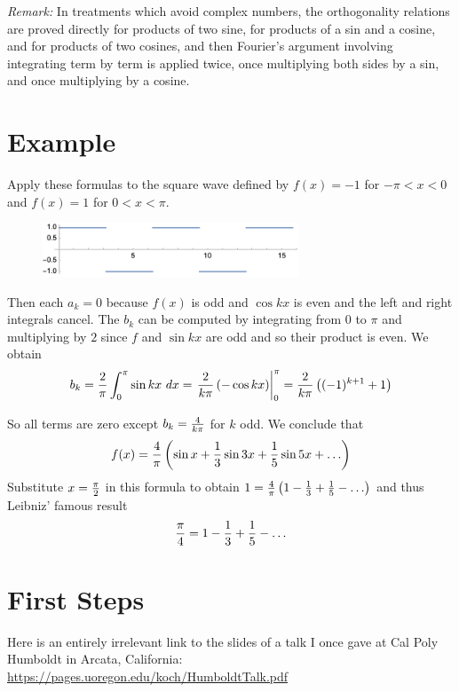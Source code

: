 \documentclass[11pt, oneside]{article}   	%
\begin{document}
 {\em Remark:} In treatments which avoid complex numbers, the orthogonality relations are proved directly for products of two sine, for products of a sin and a cosine, and for products of two cosines, and then Fourier's argument involving integrating term by term is applied twice, once multiplying both sides by a sin, and once multiplying by a cosine.
 
\section{Example}

Apply these formulas to the square wave defined by $f(x) = -1$ for $- \pi < x < 0$ and $f(x) = 1$ for $0 < x < \pi$.

\begin{figure}[H] %
   \centering
   \includegraphics[width=3in]{Graphics/squarewave}
\end{figure}



Then each $a_k = 0$ because $f(x)$ is odd and $\cos kx$ is even and the left and right integrals cancel.
The $b_k$ can be computed by integrating from $0$ to $\pi$ and multiplying by $2$ since $f$ and $\sin kx$ are odd and so their product is even. We obtain
\[b_k = {2 \over \pi} \int_0^\pi  \sin kx \ dx = \left. {2 \over {k \pi}} \left(- \cos kx\right) \right|_0^\pi = {2 \over {k \pi}} \left( (-1)^{k + 1} + 1 \right)\]

So all terms are zero except $b_k = {4 \over {k \pi}}$ for $k$ odd. We conclude that
\[f(x) = {4 \over \pi} \left(\sin x + {1 \over 3} \sin 3x + {1 \over 5} \sin 5x + \ldots\right)\]
Substitute $x = {\pi \over 2}$ in this formula to obtain
$1 = {4 \over \pi} \left(1 - {1 \over 3} + {1 \over 5} - \ldots\right)$ and thus Leibniz' famous result
\[{\pi \over 4} = 1 - {1 \over 3} + {1 \over 5} - \ldots\]
 

\ifx\HCode\undefined
\section{First Steps}

Here is an entirely irrelevant link to the slides of a talk I once gave at Cal Poly Humboldt in Arcata, California: \url{https://pages.uoregon.edu/koch/HumboldtTalk.pdf}
\end{document}
